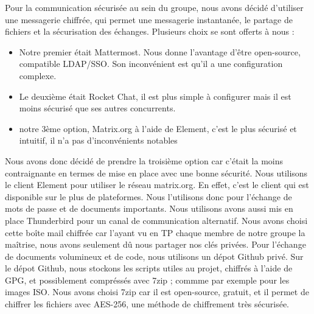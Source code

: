 \documentclass[../Livrable1.tex]{subfiles}
\begin{document}
Pour la communication sécurisée au sein du groupe, nous avons décidé d'utiliser une messagerie chiffrée, qui permet une messagerie instantanée, le partage de fichiers et la sécurisation des échanges.
Plusieurs choix se sont offerts à nous :
\begin{itemize}
    \item Notre premier était Mattermost. Nous donne l'avantage d'être open-source, compatible LDAP/SSO. Son inconvénient est qu'il a une configuration complexe.
    \item Le deuxième était Rocket Chat, il est plus simple à configurer mais il est moins sécurisé que ses autres concurrents.
    \item notre 3ème option, Matrix.org à l'aide de Element, c'est le plus sécurisé et intuitif, il n'a pas d'inconvénients notables
\end{itemize}
Nous avons donc décidé de prendre la troisième option car c'était la moins contraignante en termes de mise en place avec une bonne sécurité.
Nous utilisons le client Element pour utiliser le réseau matrix.org. En effet, c'est le client qui est disponible sur le plus de plateformes.
Nous l'utilisons donc pour l'échange de mots de passe et de documents importants.
Nous utilisons avons aussi mis en place Thunderbird pour un canal de communication alternatif.
Nous avons choisi cette boîte mail chiffrée car l'ayant vu en TP chaque membre de notre groupe la maîtrise, nous avons seulement dû nous partager nos clés privées.
Pour l'échange de documents volumineux et de code, nous utilisons un dépot Github privé.
Sur le dépot Github, nous stockons les scripts utiles au projet, chiffrés à l'aide de GPG, et possiblement compréssés avec 7zip ; commme par exemple pour les images ISO.
Nous avons choisi 7zip car il est open-source, gratuit, et il permet de chiffrer les fichiers avec AES-256, une méthode de chiffrement très sécurisée.
\end{document}
